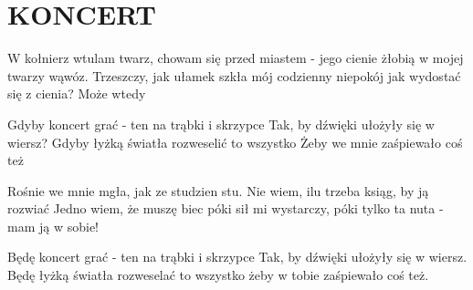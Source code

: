 \documentclass[../../../songbook.tex]{subfiles}
\begin{document}
\TabPositions{9cm} %
\section*{KONCERT}
{}
\vspace{0.5cm}
W kołnierz wtulam twarz, \newline	 
chowam się przed miastem \newline	 
- jego cienie żłobią w mojej twarzy wąwóz. \newline
Trzeszczy, jak ułamek szkła \newline
mój codzienny niepokój \newline
jak wydostać się z cienia? \newline
Może wtedy				 \newline

\-\hspace{1cm} Gdyby koncert grać - ten na trąbki i skrzypce \newline
\-\hspace{1cm} Tak, by dźwięki ułożyły się w wiersz?		 \newline
\-\hspace{1cm} Gdyby łyżką światła rozweselić to wszystko	 \newline
\-\hspace{1cm} Żeby we mnie zaśpiewało coś też				 \newline

Rośnie we mnie mgła, \newline
jak ze studzien stu. \newline
Nie wiem, ilu trzeba ksiąg, by ją rozwiać  \newline
Jedno wiem, że muszę biec \newline
póki sił mi wystarczy, \newline
póki tylko ta nuta \newline
- mam ją w sobie! \newline

\-\hspace{1cm} Będę koncert grać - ten na trąbki i skrzypce \newline
\-\hspace{1cm} Tak, by dźwięki ułożyły się w wiersz. \newline
\-\hspace{1cm} Będę łyżką światła rozweselać to wszystko \newline
\-\hspace{1cm} żeby w tobie zaśpiewało coś też. \newline
\end{document}
